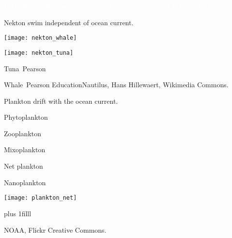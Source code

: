 \documentclass[t]{beamer}
\begin{document}

{
\begin{frame}[b]
\tiny\textcolor{white}{Betty White, Wikimedia Commons\hfill Public domain, NOAA Photo Library}
\end{frame}
}


\begin{frame}[t]{Nekton swim independent of ocean current.}
	\vspace*{-\baselineskip}
	
	\begin{multicols}{2}
		\hangpara{}
		
		\hangpara{}

		\vfill
		
		\texttt{[image: nekton\_whale]}
	
	\columnbreak
	
		\texttt{[image: nekton\_tuna]}

		
	\end{multicols}

\tiny \hfill Tuna \textcopyright\,Pearson

\tiny Whale \textcopyright\,Pearson Education\hfill Nautilus, Hans Hillewaert, Wikimedia Commons.
\end{frame}

\begin{frame}[t]{Plankton drift with the ocean current.}
	\vspace*{-\baselineskip}
	
	\begin{multicols}{2}
		\hangpara Phytoplankton
		
		\hangpara Zooplankton

		\hangpara Mixoplankton

		\vspace*{\baselineskip}
		
		\hangpara Net plankton

		\hangpara Nanoplankton
	
	\columnbreak
	
		\hangpara{}

		\hangpara{}
		
		\vspace*{\baselineskip}
		
		\texttt{[image: plankton\_net]}

	\end{multicols}

\vskip0pt plus 1filll

\hfill\tiny NOAA, Flickr Creative Commons.
\end{frame}
\end{document}
